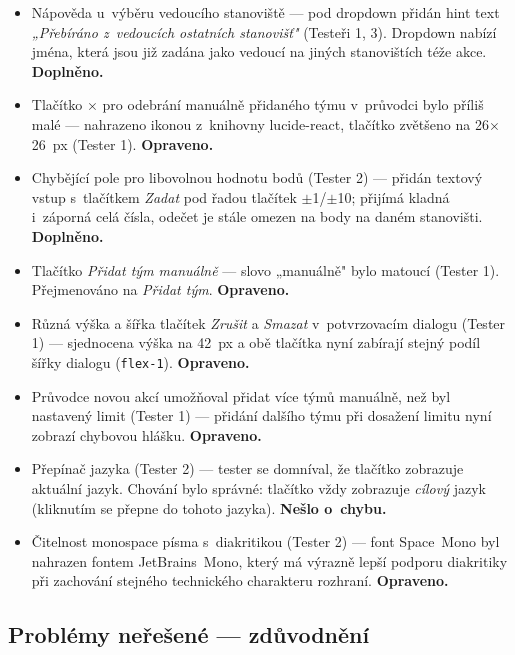 ﻿\documentclass[a4paper,12pt]{article}
\begin{document}
\begin{itemize}
    (Tester~1). Text je vizuálně zvýrazněn: zobrazuje se zeleně, pokud je hodnota
    nenulová. \textbf{Doplněno.}
  \item Nápověda u~výběru vedoucího stanoviště — pod dropdown přidán hint text
    \emph{„Přebíráno z~vedoucích ostatních stanovišť"} (Testeři 1, 3). Dropdown nabízí
    jména, která jsou již zadána jako vedoucí na jiných stanovištích téže akce.
    \textbf{Doplněno.}
  \item Tlačítko $\times$ pro odebrání manuálně přidaného týmu v~průvodci bylo příliš
    malé — nahrazeno ikonou z~knihovny lucide-react, tlačítko zvětšeno na
    26$\times$26~px (Tester 1). \textbf{Opraveno.}
  \item Chybějící pole pro libovolnou hodnotu bodů (Tester 2) — přidán textový
    vstup s~tlačítkem \emph{Zadat} pod řadou tlačítek $\pm$1/$\pm$10; přijímá
    kladná i~záporná celá čísla, odečet je stále omezen na body na daném
    stanovišti. \textbf{Doplněno.}
  \item Tlačítko \emph{Přidat tým manuálně} — slovo „manuálně" bylo matoucí
    (Tester 1). Přejmenováno na \emph{Přidat tým}. \textbf{Opraveno.}
  \item Různá výška a šířka tlačítek \emph{Zrušit} a \emph{Smazat} v~potvrzovacím
    dialogu (Tester 1) — sjednocena výška na 42~px a obě tlačítka nyní zabírají
    stejný podíl šířky dialogu (\texttt{flex-1}). \textbf{Opraveno.}
  \item Průvodce novou akcí umožňoval přidat více týmů manuálně, než byl
    nastavený limit (Tester 1) — přidání dalšího týmu při dosažení limitu nyní
    zobrazí chybovou hlášku. \textbf{Opraveno.}
  \item Přepínač jazyka (Tester 2) — tester se domníval, že tlačítko zobrazuje
    aktuální jazyk. Chování bylo správné: tlačítko vždy zobrazuje \emph{cílový}
    jazyk (kliknutím se přepne do tohoto jazyka). \textbf{Nešlo o~chybu.}
  \item Čitelnost monospace písma s~diakritikou (Tester 2) — font Space~Mono
    byl nahrazen fontem JetBrains~Mono, který má výrazně lepší podporu
    diakritiky při zachování stejného technického charakteru rozhraní.
    \textbf{Opraveno.}
\end{itemize}

\subsection{Problémy neřešené — zdůvodnění}
\end{document}
